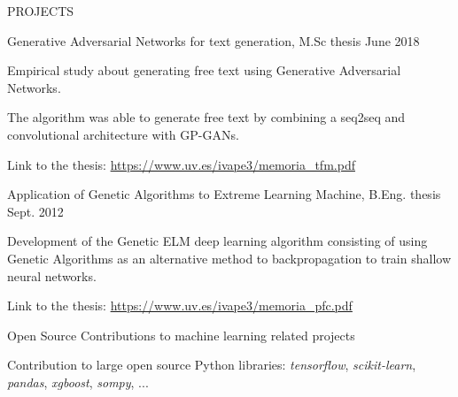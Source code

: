 \documentclass{resume} %
\begin{document}

\begin{rSection}{PROJECTS}

\begin{rSubsection}{Generative Adversarial Networks for text generation, M.Sc thesis}
{June 2018}{}{}  %

\vspace{-3pt}

\item Empirical study about generating free text using Generative Adversarial Networks.
\item The algorithm was able to generate free text by combining a seq2seq and convolutional architecture with GP-GANs.
\item Link to the thesis: \url{https://www.uv.es/ivape3/memoria\_tfm.pdf}

\end{rSubsection}

\vspace{-6pt}

\begin{rSubsection}{Application of Genetic Algorithms to Extreme Learning Machine, B.Eng. thesis}
{Sept. 2012}{}{}  

\vspace{-3pt}

\item Development of the Genetic ELM deep learning algorithm consisting of using Genetic Algorithms as an alternative method to backpropagation to train shallow neural networks.
\item Link to the thesis: \url{https://www.uv.es/ivape3/memoria\_pfc.pdf}

\end{rSubsection}

\vspace{-6pt}

\begin{rSubsection}{Open Source Contributions to machine learning related projects}
{}{}{}  

\vspace{-3pt}

\item Contribution to large open source Python libraries: \textit{tensorflow}, \textit{scikit-learn}, \textit{pandas}, \textit{xgboost}, \textit{sompy}, ... 

\end{rSubsection}


\end{rSection}
\end{document}

